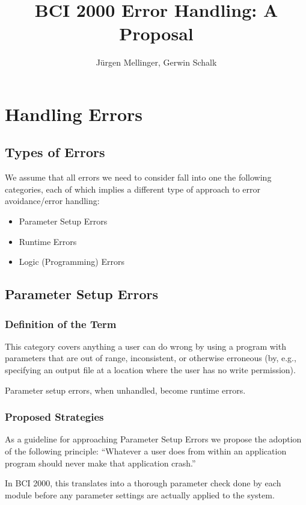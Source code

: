 \documentclass[12pt,a4paper]{article}
\title{BCI 2000 Error Handling: A Proposal}
\author{J\"urgen Mellinger, Gerwin Schalk}
\begin{document}
\maketitle
\tableofcontents

\pagebreak
\section{Handling Errors}
\label{secHandl}
\subsection{Types of Errors}
We assume that all errors we need to consider fall 
into one the following categories, each of which
implies a different type of approach to error
avoidance/error handling:
\begin{itemize}
\item{Parameter Setup Errors}
\item{Runtime Errors}
\item{Logic (Programming) Errors}
\end{itemize}

\subsection{Parameter Setup Errors}

\subsubsection{Definition of the Term}

This category covers anything a user can do wrong
by using a program with parameters that are out of range,
inconsistent, or otherwise erroneous (by, e.g.,
specifying an output file at a location where the user
has no write permission).

Parameter setup errors, when unhandled, become runtime errors.

\subsubsection{Proposed Strategies}
\label{secParamcheck}

As a guideline for approaching Parameter Setup Errors
we propose the adoption of the following principle: ``Whatever a
user does from within an application program should never
make that application crash.''

In BCI 2000, this translates into a thorough parameter
check done by each module before any parameter settings are
actually applied to the system.
\end{document}
